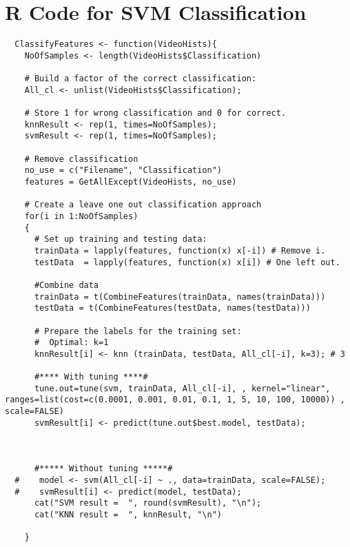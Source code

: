 \chapter{\label{ap:svm_classification}R Code for SVM Classification}

\begin{verbatim}
  ClassifyFeatures <- function(VideoHists){
    NoOfSamples <- length(VideoHists$Classification)

    # Build a factor of the correct classification:
    All_cl <- unlist(VideoHists$Classification);

    # Store 1 for wrong classification and 0 for correct.
    knnResult <- rep(1, times=NoOfSamples);
    svmResult <- rep(1, times=NoOfSamples);

    # Remove classification
    no_use = c("Filename", "Classification")
    features = GetAllExcept(VideoHists, no_use)

    # Create a leave one out classification approach
    for(i in 1:NoOfSamples)
    {
      # Set up training and testing data:
      trainData = lapply(features, function(x) x[-i]) # Remove i.
      testData  = lapply(features, function(x) x[i]) # One left out.

      #Combine data
      trainData = t(CombineFeatures(trainData, names(trainData)))
      testData = t(CombineFeatures(testData, names(testData)))

      # Prepare the labels for the training set:
      #  Optimal: k=1
      knnResult[i] <- knn (trainData, testData, All_cl[-i], k=3); # 3

      #**** With tuning ****#
      tune.out=tune(svm, trainData, All_cl[-i], , kernel="linear", ranges=list(cost=c(0.0001, 0.001, 0.01, 0.1, 1, 5, 10, 100, 10000)) , scale=FALSE)
      svmResult[i] <- predict(tune.out$best.model, testData);



      #***** Without tuning *****#
  #    model <- svm(All_cl[-i] ~ ., data=trainData, scale=FALSE);
  #    svmResult[i] <- predict(model, testData);
      cat("SVM result =  ", round(svmResult), "\n");
      cat("KNN result =  ", knnResult, "\n")

    }
\end{verbatim}
